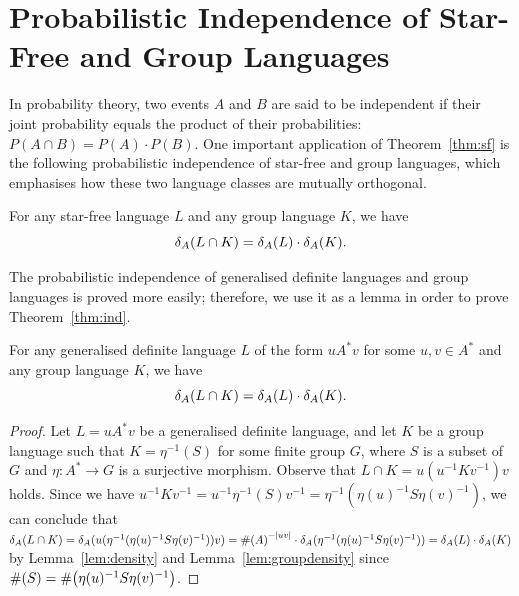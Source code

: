 \section{Probabilistic Independence of Star-Free and Group Languages}\label{sec:ind}
In probability theory, two events \(A\) and \(B\) are said to be independent
if their joint probability equals the product of their probabilities:
\(P(A \cap B) = P(A) \cdot P(B)\).
One important application of Theorem~\ref{thm:sf} is the following probabilistic independence of star-free and group languages, which emphasises how these two language classes are mutually orthogonal.
\begin{theorem}[Y.-S.]\label{thm:ind}
For any star-free language \(L\) and any group language \(K\),
we have 
\[
 \delta_{A}(L \cap K) = \delta_{A}(L) \cdot \delta_{A}(K).
\]
\end{theorem}
The probabilistic independence of generalised definite languages and group languages is proved more easily; therefore, we use it as a lemma in order to prove Theorem~\ref{thm:ind}.
\begin{lemma}\label{lem:ind}
For any generalised definite language \(L\) of the form \(u A^* v\) for some \(u, v \in A^*\) and any group language \(K\),
we have 
\[
 \delta_{A}(L \cap K) = \delta_{A}(L) \cdot \delta_{A}(K).
\]
\end{lemma}
\begin{proof}
Let \(L = u A^* v\) be a generalised definite language, and let \(K\) be a group language such that \(K = \eta^{-1}(S)\) for some finite group \(G\), where \(S\) is a subset of \(G\) and \(\eta\colon A^* \rightarrow G\) is a surjective morphism.
Observe that \(L \cap K = u (u^{-1} K v^{-1}) v\) holds.
Since we have \(u^{-1} K v^{-1} = u^{-1} \eta^{-1}(S) v^{-1} 
= \eta^{-1}( \eta(u)^{-1} S \eta(v)^{-1})\),
we can conclude that 
\(\delta_{A}(L \cap K) = \delta_{A}(u(\eta^{-1}( \eta(u)^{-1} S \eta(v)^{-1})) v) =
\#\!\left(A\right)^{-|uv|} \cdot \delta_{A}(\eta^{-1}( \eta(u)^{-1} S \eta(v)^{-1}))
= \delta_{A}(L) \cdot \delta_{A}(K)
\)
by Lemma~\ref{lem:density} and Lemma~\ref{lem:groupdensity} since 
\(\#\!\left(S\right) = \#\!\left(\eta(u)^{-1} S \eta(v)^{-1}\right)\).
\end{proof}
